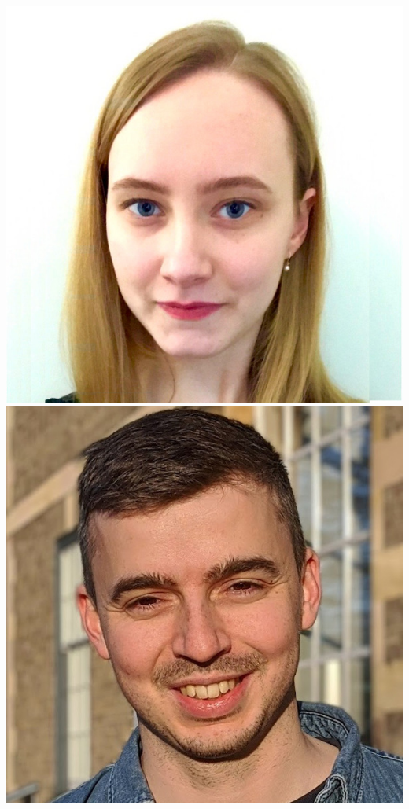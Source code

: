 \documentclass[aspectratio=169]{beamer}
\begin{document}
\begin{frame}
{            \includegraphics[width=0.1\textheight]{figures/students/danielle_dineen.jpg}%
            \includegraphics[width=0.1\textheight]{figures/students/david_yallup.jpg}%
}
\end{frame}
\end{document}
